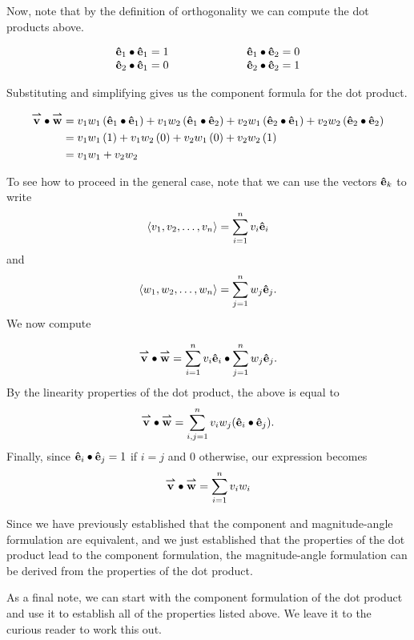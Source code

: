 \documentclass{ximera}
\begin{document}
\begin{theorem}
\begin{explanation}
Now, note that by the definition of orthogonality we can compute the dot products above.

\[
\begin{array}{ll}
\mathbf{\hat{e}}_1 \bullet \mathbf{\hat{e}}_1 = 1 \qquad \qquad \qquad & \mathbf{\hat{e}}_1 \bullet \mathbf{\hat{e}}_2 = 0 \\
\mathbf{\hat{e}}_2 \bullet \mathbf{\hat{e}}_1 = 0 \qquad \qquad & \mathbf{\hat{e}}_2 \bullet \mathbf{\hat{e}}_2 = 1 \\
\end{array}
\]

Substituting and simplifying gives us the component formula for the dot product.

\begin{align*}
{\overset{\boldsymbol{\rightharpoonup}}{\mathbf{v}}} \bullet {\overset{\boldsymbol{\rightharpoonup}}{\mathbf{w}}} &= v_1w_1 \left(\mathbf{\hat{e}}_1 \bullet \mathbf{\hat{e}}_1\right) + v_1w_2 \left(\mathbf{\hat{e}}_1 \bullet \mathbf{\hat{e}}_2\right) + v_2w_1 \left(\mathbf{\hat{e}}_2 \bullet \mathbf{\hat{e}}_1 \right)+ v_2w_2 \left(\mathbf{\hat{e}}_2 \bullet \mathbf{\hat{e}}_2\right) \\
&= v_1w_1 \left(1\right) + v_1w_2 \left(0\right) + v_2w_1 \left(0 \right)+ v_2w_2 \left(1\right)\\
&=v_1w_1+v_2w_2
\end{align*}

To see how to proceed in the general case, note that we can use the vectors $\mathbf{\hat{e}}_k$ to write
  \[ 
  \left\langle v_1,v_2, \dots,v_n\right\rangle = \sum_{i=1}^n v_i \mathbf{\hat{e}}_i
  \]
  and
  \[ 
  \left\langle w_1,w_2, \dots,w_n\right\rangle = \sum_{j=1}^n w_j \mathbf{\hat{e}}_j.
  \]	 
    We now compute

\[
{\overset{\boldsymbol{\rightharpoonup}}{\mathbf{v}}} \bullet {\overset{\boldsymbol{\rightharpoonup}}{\mathbf{w}}} = \sum_{i=1}^n v_i \mathbf{\hat{e}}_i \bullet \sum_{j=1}^n w_j \mathbf{\hat{e}}_j.
\]
    By the linearity properties of the dot product, the above is equal to
    \[
   {\overset{\boldsymbol{\rightharpoonup}}{\mathbf{v}}} \bullet {\overset{\boldsymbol{\rightharpoonup}}{\mathbf{w}}} =    \sum_{i,j =1}^n v_iw_j(\mathbf{\hat{e}}_i \bullet \mathbf{\hat{e}}_j).
    \]
    Finally, since $\mathbf{\hat{e}}_i \bullet \mathbf{\hat{e}}_j = 1$ if $i=j$ and $0$ otherwise, our expression becomes
    \begin{align*}
   {\overset{\boldsymbol{\rightharpoonup}}{\mathbf{v}}} \bullet {\overset{\boldsymbol{\rightharpoonup}}{\mathbf{w}}} &= \sum_{i=1}^n v_iw_i \\
    \end{align*}
    
Since we have previously established that the component and magnitude-angle formulation are equivalent, and we just established that the properties of the dot product lead to the component formulation, the magnitude-angle formulation can be derived from the properties of the dot product. 

As a final note, we can start with the component formulation of the dot product and use it to establish all of the properties listed above.  We leave it to the curious reader to work this out.
\end{explanation}
\end{theorem}
\end{document}

